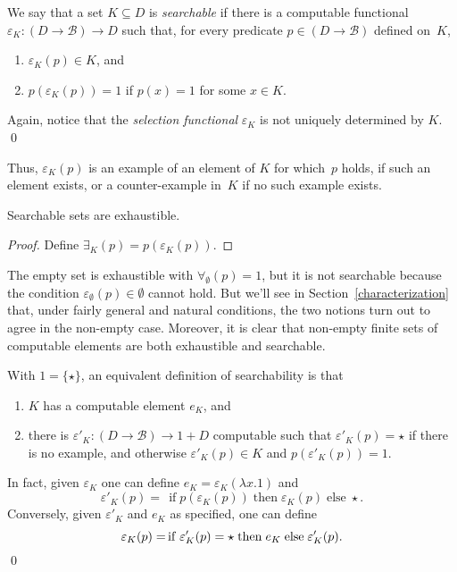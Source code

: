 \documentclass{LMCS}
\newcommand{\e}{\varepsilon}
\newcommand{\licsmath}[1]{\[ #1 \]}
\newcommand{\pBool}{\mathcal{B}}
\newcommand{\If}{\,\mathrel{\operatorname{if}}}
\newcommand{\Then}{\mathrel{\operatorname{then}}}
\newcommand{\Else}{\mathrel{\operatorname{else}}}
\newcommand{\True}{1}\newcommand{\False}{0}\newcommand{\domain}[1]{{\D_{#1}}}
\newcommand{\D}{D}
\begin{document}
\pagebreak[3]
\begin{defi} \label{searchable:def}
  We say that a set $K \subseteq \D$ is \emph{searchable} if there is
  a computable functional $\e_K \colon (\D \to \pBool) \to
  \D$ such that, for every predicate $p \in (\D \to \pBool)$ defined
  on~$K$,
\pagebreak[3]
  \begin{enumerate}
  \item $\e_K(p) \in K$, and
  \item \label{searchable:def:2} $p(\e_K(p))=\True$ if $p(x)=\True$ for some $x \in K$.
  \end{enumerate}
  Again, notice that the \emph{selection functional} $\e_K$ is not
  uniquely determined by $K$. \qed
\end{defi}
Thus, $\e_K(p)$ is an example of an element of $K$ for
which~$p$ holds, if such an element exists, or a counter-example
in~$K$ if no such example exists.
\begin{lem} \label{implicit}
  Searchable sets are exhaustible. 
\end{lem}
\begin{proof}
  Define $\exists_K(p)=p(\e_K(p))$.
\end{proof}
The empty set is exhaustible with $\forall_{\emptyset}(p)=\True$, but
it is not searchable because the condition $\e_{\emptyset}(p)
\in \emptyset$ cannot hold. But we'll see in
Section~\ref{characterization} that, under fairly general and natural
conditions, the two notions turn out to agree in the non-empty case.
Moreover, it is clear that non-empty finite sets of computable
elements are both exhaustible and searchable.

\begin{rem} \label{searchable:equivalent}
With $1=\{\star\}$, an equivalent definition of searchability is that
\begin{enumerate}
\item $K$ has a computable element $e_K$, and
\item there is $\e'_K \colon (\D \to
  \pBool) \to 1+\D$ computable such that $\e'_K(p)
  = \star$ if there is no example, and otherwise $\e'_K(p)
  \in K$ and $p(\e'_K(p))=\True$.
\end{enumerate}
In fact, given $\e_K$ one can define $e_K =
\e_K(\lambda x.\True)$ and \licsmath{\e'_K(p) = \If
  p(\e_K(p)) \Then \e_K(p) \Else \star.}
Conversely, given $\e'_K$ and $e_K$ as specified, one can
define \licsmath{\e_K(p)= \linebreak[3] \If
  \e'_K(p)=\star \Then e_K \Else \e'_K(p).} \qed
\end{rem}
\end{document}
